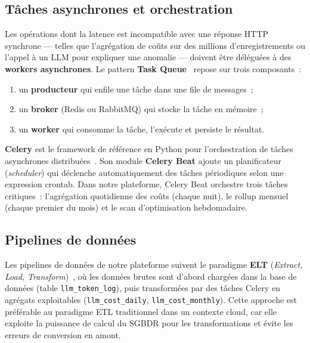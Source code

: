 \subsection{Tâches asynchrones et orchestration}

Les opérations dont la latence est incompatible avec une réponse HTTP synchrone --- telles que l'agrégation de coûts sur des millions d'enregistrements ou l'appel à un LLM pour expliquer une anomalie --- doivent être déléguées à des \textbf{workers asynchrones}. Le pattern \textbf{Task Queue}~\cite{hohpe2003} repose sur trois composants~:

\begin{enumerate}[noitemsep]
    \item un \textbf{producteur} qui enfile une tâche dans une file de messages~;
    \item un \textbf{broker} (Redis ou RabbitMQ) qui stocke la tâche en mémoire~;
    \item un \textbf{worker} qui consomme la tâche, l'exécute et persiste le résultat.
\end{enumerate}

\textbf{Celery} est le framework de référence en Python pour l'orchestration de tâches asynchrones distribuées~\cite{celery2024}. Son module \textbf{Celery Beat} ajoute un planificateur (\textit{scheduler}) qui déclenche automatiquement des tâches périodiques selon une expression crontab. Dans notre plateforme, Celery Beat orchestre trois tâches critiques~: l'agrégation quotidienne des coûts (chaque nuit), le rollup mensuel (chaque premier du mois) et le scan d'optimisation hebdomadaire.

\subsection{Pipelines de données}

Les pipelines de données de notre plateforme suivent le paradigme \textbf{ELT} (\textit{Extract, Load, Transform})~\cite{kleppmann2017}, où les données brutes sont d'abord chargées dans la base de données (table \texttt{llm\_token\_log}), puis transformées par des tâches Celery en agrégats exploitables (\texttt{llm\_cost\_daily}, \texttt{llm\_cost\_monthly}). Cette approche est préférable au paradigme ETL traditionnel dans un contexte cloud, car elle exploite la puissance de calcul du SGBDR pour les transformations et évite les erreurs de conversion en amont.


